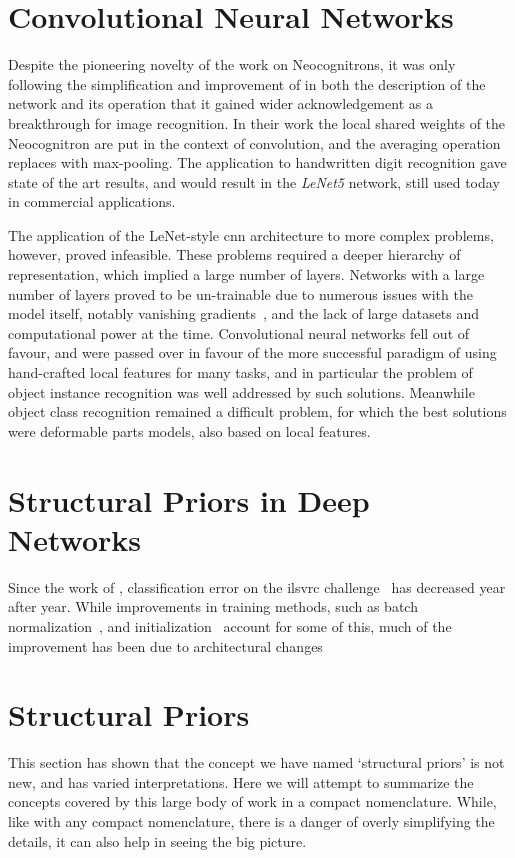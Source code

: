 \documentclass[thesis]{subfiles}
\begin{document}
	\section{Convolutional Neural Networks}
	
	Despite the pioneering novelty of the work on Neocognitrons, it was only following the simplification and improvement of \citet{lecun1989backpropagation,Lecun1998} in both the description of the network and its operation that it gained wider acknowledgement as a breakthrough for image recognition. In their work the local shared weights of the Neocognitron are put in the context of convolution, and the averaging operation replaces with max-pooling. The application to handwritten digit recognition gave state of the art results, and would result in the \emph{LeNet5} network, still used today in commercial applications.
	
	The application of the LeNet-style \gls{cnn} architecture to more complex problems, however, proved infeasible. These problems required a deeper hierarchy of representation, which implied a large number of layers. Networks with a large number of layers proved to be un-trainable due to numerous issues with the model itself, notably vanishing gradients~\citep{hochreiter1991untersuchungen}, and the lack of large datasets and computational power at the time. Convolutional neural networks fell out of favour, and were passed over in favour of the more successful paradigm of using hand-crafted local features for many tasks, and in particular the problem of object instance recognition was well addressed by such solutions. Meanwhile object class recognition remained a difficult problem, for which the best solutions were deformable parts models, also based on local features.
	
\section{Structural Priors in Deep Networks}
Since the work of \citet{Krizhevsky2012}, classification error on the \gls{ilsvrc} challenge~\citep{ILSVRC2015} has decreased year after year. While improvements in training methods, such as batch normalization~\citep{Ioffe2015}, and initialization~\citep{He2015b} account for some of this, much of the improvement has been due to architectural changes
	\citep{Simonyan2014verydeep}
	\citep{He2015}
	\citep{He2016}


\section{Structural Priors}
    This section has shown that the concept we have named `structural priors' is not new, and has varied interpretations. Here we will attempt to summarize the concepts covered by this large body of work in a compact nomenclature. While, like with any compact nomenclature, there is a danger of overly simplifying the details, it can also help in seeing the big picture.
    
\end{document}
